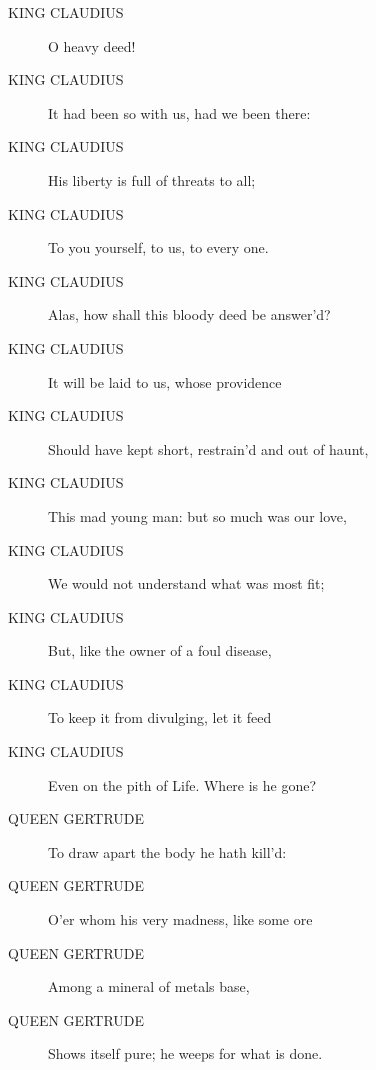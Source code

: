 \documentclass{article}
\begin{document}
\begin{description}
            
\item[KING CLAUDIUS] O heavy deed!
\item[KING CLAUDIUS] It had been so with us, had we been there:
\item[KING CLAUDIUS] His liberty is full of threats to all;
\item[KING CLAUDIUS] To you yourself, to us, to every one.
\item[KING CLAUDIUS] Alas, how shall this bloody deed be answer'd?
\item[KING CLAUDIUS] It will be laid to us, whose providence
\item[KING CLAUDIUS] Should have kept short, restrain'd and out of haunt,
\item[KING CLAUDIUS] This mad young man: but so much was our love,
\item[KING CLAUDIUS] We would not understand what was most fit;
\item[KING CLAUDIUS] But, like the owner of a foul disease,
\item[KING CLAUDIUS] To keep it from divulging, let it feed
\item[KING CLAUDIUS] Even on the pith of Life. Where is he gone?
\end{description}
          
\begin{description}
            
\item[QUEEN GERTRUDE] To draw apart the body he hath kill'd:
\item[QUEEN GERTRUDE] O'er whom his very madness, like some ore
\item[QUEEN GERTRUDE] Among a mineral of metals base,
\item[QUEEN GERTRUDE] Shows itself pure; he weeps for what is done.
\end{description}
          
\end{document}
